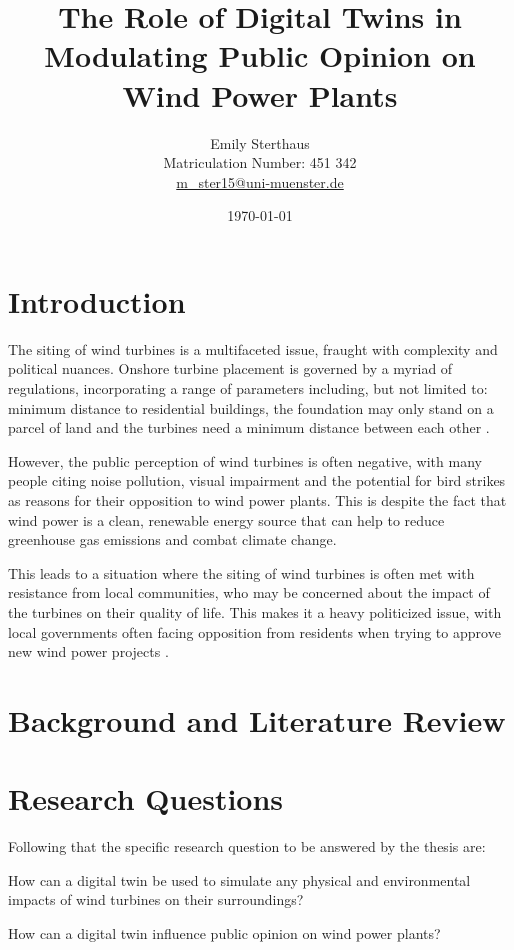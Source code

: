 \documentclass[11pt, titlepage, a4paper]{article}
\title{The Role of Digital Twins in Modulating Public Opinion on Wind Power Plants}
\author{Emily Sterthaus \\ Matriculation Number: 451 342 \\ \href{mailto:m_ster15@uni-muenster.de}{m\_ster15@uni-muenster.de}}
\affil{Institute of Geoinformatics, University of Münster}
\date{\today}
\begin{document}
\maketitle


\newpage
\begin{linenumbers}
    \section{Introduction}
    The siting of wind turbines is a multifaceted issue, fraught with complexity and political nuances. Onshore
    turbine placement is governed by a myriad of regulations, incorporating a range of parameters including, but not
    limited to: minimum distance to residential buildings, the foundation may only stand on a parcel of land and the
    turbines need a minimum distance between each other
    \cite{niedersachsischesministeriumfurumweltenergieundklimaschutzPlanungUndGenehmigung2021}.

    However, the public perception of wind turbines is often negative, with many people citing noise pollution, visual impairment and the potential for bird strikes as reasons for their opposition to wind power plants. This is despite the fact that wind power is a clean, renewable energy source that can help to reduce greenhouse gas emissions and combat climate change.

    This leads to a situation where the siting of wind turbines is often met with resistance from local communities, who may be concerned about the impact of the turbines on their quality of life. This makes it a heavy politicized issue, with local governments often facing opposition from residents when trying to approve new wind power projects \cite{kwasniewskiWindenergieVerhindertAntiWindkraftBewegung2021}.


    \section{Background and Literature Review}

    \section{Research Questions}
    Following that the specific research question to be answered by the thesis are:
    \begin{questions}
        \item How can a digital twin be used to simulate any physical and environmental impacts of wind turbines on their surroundings?
        \item How can a digital twin influence public opinion on wind power plants?
    \end{questions}


\end{linenumbers}
\end{document}
